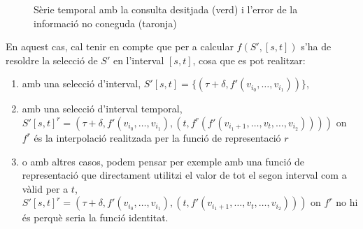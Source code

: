 \begin{figure}[tp]
  \centering

      \caption{Sèrie temporal amb la consulta desitjada (verd) i l'error de la
        informació no coneguda (taronja)}
  \label{fig:multiresolucio:informacio-subresolucions}
\end{figure}



En aquest cas, cal tenir en compte que per a calcular
$f(S',[s,t])$ s'ha de resoldre la selecció de $S'$ en l'interval $[s,t]$, cosa que es pot realitzar:

  \begin{enumerate}
  \item amb una selecció d'interval,  $S'[s,t]=\{ (\tau+\delta,
    f'(v_{i_0},\dotsc,v_{i_1}) ) \}$,

  \item amb una selecció d'interval temporal,
    $S'[s,t]^r=(\tau+\delta, f'(v_{i_0},\dotsc,v_{i_1}), (t,
    f^r(f'(v_{i_1+1},\dotsc,v_{t} ,\dotsc,v_{i_2}))) ) $ on $f^r$ és
    la interpolació realitzada per la funció de representació $r$

  \item o amb altres casos, podem pensar per exemple amb una funció de
    representació que directament utilitzi el valor de tot el segon
    interval com a vàlid per a $t$, $S'[s,t]^r=(\tau+\delta,
    f'(v_{i_0},\dotsc,v_{i_1}), (t, f'(v_{i_1+1},\dotsc,v_{t}
    ,\dotsc,v_{i_2})) )$ on $f^r$ no hi és perquè seria la funció identitat.
   \end{enumerate}



